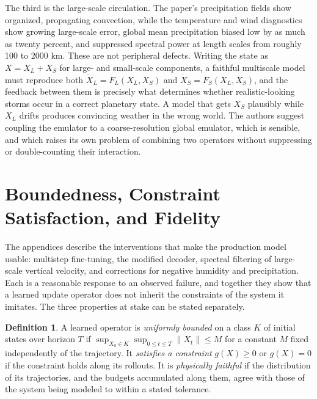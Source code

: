 \documentclass[11pt]{article}
\theoremstyle{definition}
\newtheorem{definition}{Definition}
\theoremstyle{remark}
\begin{document}
The third is the large-scale circulation. The paper's precipitation fields show organized, propagating convection, while the temperature and wind diagnostics show growing large-scale error, global mean precipitation biased low by as much as twenty percent, and suppressed spectral power at length scales from roughly 100 to 2000 km. These are not peripheral defects. Writing the state as $X = X_L + X_S$ for large- and small-scale components, a faithful multiscale model must reproduce both $\dot X_L = F_L(X_L, X_S)$ and $\dot X_S = F_S(X_L, X_S)$, and the feedback between them is precisely what determines whether realistic-looking storms occur in a correct planetary state. A model that gets $X_S$ plausibly while $X_L$ drifts produces convincing weather in the wrong world. The authors suggest coupling the emulator to a coarse-resolution global emulator, which is sensible, and which raises its own problem of combining two operators without suppressing or double-counting their interaction.

\section{Boundedness, Constraint Satisfaction, and Fidelity}

The appendices describe the interventions that make the production model usable: multistep fine-tuning, the modified decoder, spectral filtering of large-scale vertical velocity, and corrections for negative humidity and precipitation. Each is a reasonable response to an observed failure, and together they show that a learned update operator does not inherit the constraints of the system it imitates. The three properties at stake can be stated separately.

\begin{definition}
A learned operator is \emph{uniformly bounded} on a class $K$ of initial states over horizon $T$ if $\sup_{X_0\in K}\sup_{0\le t\le T}\|X_t\| \le M$ for a constant $M$ fixed independently of the trajectory. It \emph{satisfies a constraint} $g(X)\ge 0$ or $g(X)=0$ if the constraint holds along its rollouts. It is \emph{physically faithful} if the distribution of its trajectories, and the budgets accumulated along them, agree with those of the system being modeled to within a stated tolerance.
\end{definition}
\end{document}
